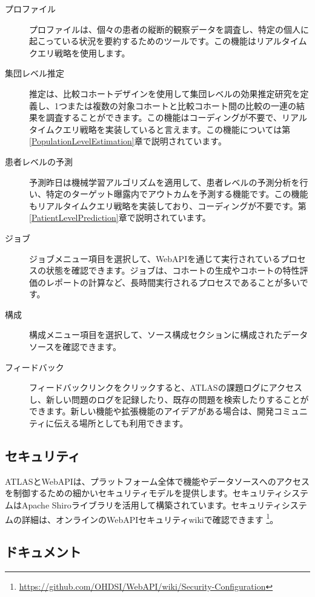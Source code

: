 \documentclass[
  11pt]{book}
\theoremstyle{definition}
\theoremstyle{definition}
\theoremstyle{definition}
\theoremstyle{definition}
\theoremstyle{remark}
\begin{document}
\begin{description}
\item[プロファイル ]
プロファイルは、個々の患者の縦断的観察データを調査し、特定の個人に起こっている状況を要約するためのツールです。この機能はリアルタイムクエリ戦略を使用します。
\item[集団レベル推定 ]
推定は、比較コホートデザインを使用して集団レベルの効果推定研究を定義し、1つまたは複数の対象コホートと比較コホート間の比較の一連の結果を調査することができます。この機能はコーディングが不要で、リアルタイムクエリ戦略を実装していると言えます。この機能については第\ref{PopulationLevelEstimation}章で説明されています。
\item[患者レベルの予測 ]
予測昨日は機械学習アルゴリズムを適用して、患者レベルの予測分析を行い、特定のターゲット曝露内でアウトカムを予測する機能です。この機能もリアルタイムクエリ戦略を実装しており、コーディングが不要です。第\ref{PatientLevelPrediction}章で説明されています。
\item[ジョブ ]
ジョブメニュー項目を選択して、WebAPIを通じて実行されているプロセスの状態を確認できます。ジョブは、コホートの生成やコホートの特性評価のレポートの計算など、長時間実行されるプロセスであることが多いです。
\item[構成 ]
構成メニュー項目を選択して、ソース構成セクションに構成されたデータソースを確認できます。
\item[フィードバック ]
フィードバックリンクをクリックすると、ATLASの課題ログにアクセスし、新しい問題のログを記録したり、既存の問題を検索したりすることができます。新しい機能や拡張機能のアイデアがある場合は、開発コミュニティに伝える場所としても利用できます。
\end{description}

\subsection{セキュリティ}\label{ux30bbux30adux30e5ux30eaux30c6ux30a3}

ATLASとWebAPIは、プラットフォーム全体で機能やデータソースへのアクセスを制御するための細かいセキュリティモデルを提供します。セキュリティシステムはApache Shiroライブラリを活用して構築されています。セキュリティシステムの詳細は、オンラインのWebAPIセキュリティwikiで確認できます \footnote{\url{https://github.com/OHDSI/WebAPI/wiki/Security-Configuration}}。 

\subsection{ドキュメント}\label{ux30c9ux30adux30e5ux30e1ux30f3ux30c8}
\end{document}
